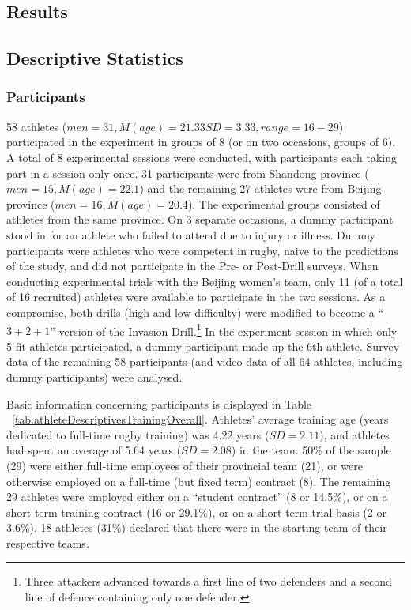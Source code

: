 \begin{CJK}{UTF8}{gbsn}
\clearpage
\section{Results}


\subsection{Descriptive Statistics \label{sec:descriptives}}

\subsubsection{Participants}
58 athletes ($men = 31, M(age) = 21.33 SD = 3.33, range = 16-29$) participated in the experiment in groups of 8 (or on two occasions, groups of 6).  A total of 8 experimental sessions were conducted, with participants each taking part in a session only once.  31 participants were from Shandong province ($men = 15, M(age) = 22.1$) and the remaining 27 athletes were from Beijing province ($men = 16, M(age) = 20.4$).  The experimental groups consisted of athletes from the same province. On 3 separate occasions, a dummy participant stood in for an athlete who failed to attend due to injury or illness.  Dummy participants were athletes who were competent in rugby, naive to the predictions of the study, and did not participate in the Pre- or Post-Drill surveys. When conducting experimental trials with the Beijing women's team, only 11 (of a total of 16 recruited) athletes were available to participate in the two sessions.  As a compromise, both drills (high and low difficulty) were modified to become a ``$3+2+1$'' version of the Invasion Drill.\footnote{Three attackers advanced towards a first line of two defenders and a second line of defence containing only one defender.} In the experiment session in which only 5 fit athletes participated, a dummy participant made up the 6th athlete.  Survey data of the remaining 58 participants (and video data of all 64 athletes, including dummy participants) were analysed.



Basic information concerning participants is displayed in Table ~\ref{tab:athleteDescriptivesTrainingOverall}.  Athletes' average training age (years dedicated to full-time rugby training) was 4.22 years ($SD = 2.11$), and athletes had spent an average of 5.64 years ($SD = 2.08$) in the team.  50\% of the sample (29) were either full-time employees of their provincial team (21), or were otherwise employed on a full-time (but fixed term) contract (8).  The remaining 29 athletes were employed either on a ``student contract'' (8 or 14.5\%), or on a short term training contract (16 or 29.1\%), or on a short-term trial basis (2 or 3.6\%).  18 athletes (31\%) declared that there were in the starting team of their respective teams.


\end{CJK}
